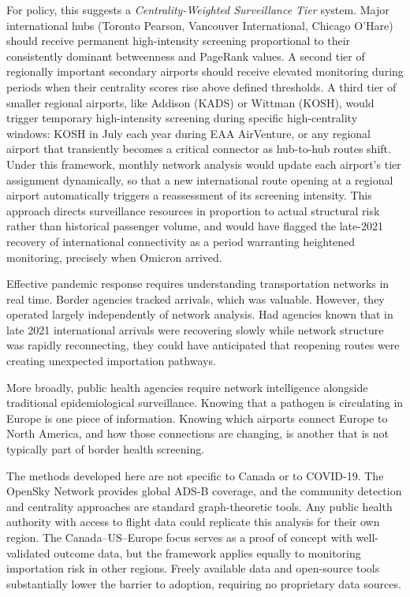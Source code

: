 \documentclass{elsarticle}
\begin{document}
For policy, this suggests a \textit{Centrality-Weighted Surveillance Tier} system. Major international hubs (Toronto Pearson, Vancouver International, Chicago O'Hare) should receive permanent high-intensity screening proportional to their consistently dominant betweenness and PageRank values. A second tier of regionally important secondary airports should receive elevated monitoring during periods when their centrality scores rise above defined thresholds. A third tier of smaller regional airports, like Addison (KADS) or Wittman (KOSH), would trigger temporary high-intensity screening during specific high-centrality windows: KOSH in July each year during EAA AirVenture, or any regional airport that transiently becomes a critical connector as hub-to-hub routes shift. Under this framework, monthly network analysis would update each airport's tier assignment dynamically, so that a new international route opening at a regional airport automatically triggers a reassessment of its screening intensity. This approach directs surveillance resources in proportion to actual structural risk rather than historical passenger volume, and would have flagged the late-2021 recovery of international connectivity as a period warranting heightened monitoring, precisely when Omicron arrived.

Effective pandemic response requires understanding transportation networks in real time. Border agencies tracked arrivals, which was valuable. However, they operated largely independently of network analysis. Had agencies known that in late 2021 international arrivals were recovering slowly while network structure was rapidly reconnecting, they could have anticipated that reopening routes were creating unexpected importation pathways.

More broadly, public health agencies require network intelligence alongside traditional epidemiological surveillance. Knowing that a pathogen is circulating in Europe is one piece of information. Knowing which airports connect Europe to North America, and how those connections are changing, is another that is not typically part of border health screening.

The methods developed here are not specific to Canada or to COVID-19. The OpenSky Network provides global ADS-B coverage, and the community detection and centrality approaches are standard graph-theoretic tools. Any public health authority with access to flight data could replicate this analysis for their own region. The Canada--US--Europe focus serves as a proof of concept with well-validated outcome data, but the framework applies equally to monitoring importation risk in other regions. Freely available data and open-source tools substantially lower the barrier to adoption, requiring no proprietary data sources.
\end{document}
